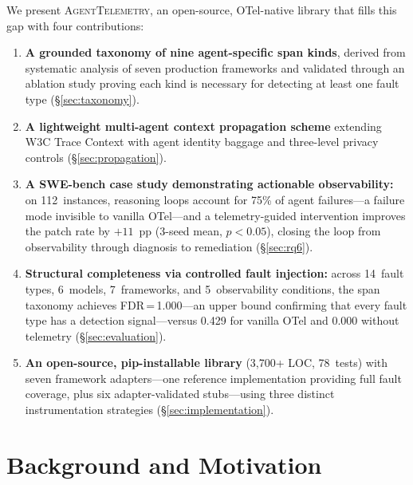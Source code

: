 \documentclass[sigplan,10pt,screen]{acmart}
\begin{document}
We present \textsc{AgentTelemetry}, an open-source, OTel-native
library that fills this gap with four contributions:

\begin{enumerate}[leftmargin=*,nosep]
\item \textbf{A grounded taxonomy of nine agent-specific span kinds},
  derived from systematic analysis of seven production frameworks and
  validated through an ablation study proving each kind is necessary
  for detecting at least one fault type (\S\ref{sec:taxonomy}).

\item \textbf{A lightweight multi-agent context propagation scheme} extending W3C
  Trace Context with agent identity baggage and three-level privacy
  controls (\S\ref{sec:propagation}).

\item \textbf{A SWE-bench case study demonstrating actionable observability:}
  on 112~instances, reasoning loops account for 75\% of agent
  failures---a failure mode invisible to vanilla OTel---and a
  telemetry-guided intervention improves the patch rate by $+11$~pp
  (3-seed mean, $p{<}0.05$), closing the loop from observability
  through diagnosis to remediation (\S\ref{sec:rq6}).

\item \textbf{Structural completeness via controlled fault injection:}
  across 14~fault types, 6~models, 7~frameworks, and 5~observability
  conditions, the span taxonomy achieves FDR\,=\,1.000---an upper
  bound confirming that every fault type has a detection signal---versus
  0.429 for vanilla OTel and 0.000 without telemetry (\S\ref{sec:evaluation}).

\item \textbf{An open-source, pip-installable library} (3{,}700+ LOC,
  78~tests) with seven framework adapters---one reference
  implementation providing full fault coverage, plus six
  adapter-validated stubs---using three distinct
  instrumentation strategies (\S\ref{sec:implementation}).
\end{enumerate}

\section{Background and Motivation}
\label{sec:background}
\end{document}
